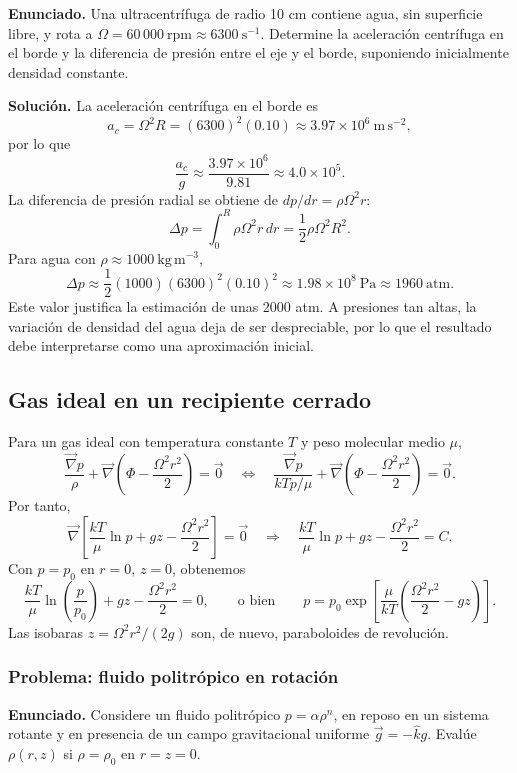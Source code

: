 \textbf{Enunciado.} Una ultracentrífuga de radio 10 cm contiene agua, sin superficie libre, y rota a $\Omega = 60\,000\ \mathrm{rpm} \approx 6300\ \mathrm{s^{-1}}$. Determine la aceleración centrífuga en el borde y la diferencia de presión entre el eje y el borde, suponiendo inicialmente densidad constante.

\textbf{Solución.} La aceleración centrífuga en el borde es
$$ a_c=\Omega^2R=(6300)^2(0.10)\approx 3.97\times10^6\ \mathrm{m\,s^{-2}}, $$
por lo que
$$ \frac{a_c}{g}\approx \frac{3.97\times10^6}{9.81}\approx 4.0\times10^5. $$
La diferencia de presión radial se obtiene de $dp/dr=\rho\Omega^2r$:
$$ \Delta p=\int_0^R\rho\Omega^2r\,dr
=\frac{1}{2}\rho\Omega^2R^2. $$
Para agua con $\rho\approx1000\ \mathrm{kg\,m^{-3}}$,
$$ \Delta p\approx\frac{1}{2}(1000)(6300)^2(0.10)^2
\approx1.98\times10^8\ \mathrm{Pa}
\approx 1960\ \mathrm{atm}. $$
Este valor justifica la estimación de unas 2000 atm. A presiones tan altas, la variación de densidad del agua deja de ser despreciable, por lo que el resultado debe interpretarse como una aproximación inicial.

\subsection{Gas ideal en un recipiente cerrado}

Para un gas ideal con temperatura constante $T$ y peso molecular medio $\mu$,
$$ \frac{\vec{\nabla}p}{\rho} + \vec{\nabla}\left(\Phi - \frac{\Omega^2 r^2}{2}\right) = \vec{0} \quad\Longleftrightarrow\quad \frac{\vec{\nabla}p}{kTp/\mu} + \vec{\nabla}\left(\Phi - \frac{\Omega^2 r^2}{2}\right) = \vec{0}. $$
Por tanto,
$$ \vec{\nabla}\left[\frac{kT}{\mu}\ln p + gz - \frac{\Omega^2 r^2}{2}\right] = \vec{0} \quad\Rightarrow\quad \frac{kT}{\mu}\ln p + gz - \frac{\Omega^2 r^2}{2} = C. $$
Con $p = p_0$ en $r = 0$, $z = 0$, obtenemos
$$ \frac{kT}{\mu}\ln\left(\frac{p}{p_0}\right) + gz - \frac{\Omega^2 r^2}{2} = 0, \qquad \text{o bien} \qquad p = p_0\exp\left[\frac{\mu}{kT}\left(\frac{\Omega^2 r^2}{2} - gz\right)\right]. $$
Las isobaras $z = \Omega^2 r^2/(2g)$ son, de nuevo, paraboloides de revolución.

\subsubsection*{Problema: fluido politrópico en rotación}

\textbf{Enunciado.} Considere un fluido politrópico $p = \alpha\rho^n$, en reposo en un sistema rotante y en presencia de un campo gravitacional uniforme $\vec{g} = -\hat{k}g$. Evalúe $\rho(r,z)$ si $\rho = \rho_0$ en $r = z = 0$.

